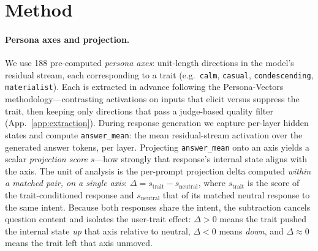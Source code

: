 \documentclass{article}
\newcommand{\ax}[1]{\texttt{#1}}   %
\begin{document}
\section{Method}
\label{sec:method}

\paragraph{Persona axes and projection.} We use 188 pre-computed \emph{persona axes}: unit-length directions in the model's residual stream, each corresponding to a trait (e.g.\ \ax{calm}, \ax{casual}, \ax{condescending}, \ax{materialist}). Each is extracted in advance following the Persona-Vectors methodology---contrasting activations on inputs that elicit versus suppress the trait, then keeping only directions that pass a judge-based quality filter (App.~\ref{app:extraction}). During response generation we capture per-layer hidden states and compute \ax{answer\_mean}: the mean residual-stream activation over the generated answer tokens, per layer. Projecting \ax{answer\_mean} onto an axis yields a scalar \emph{projection score} $s$---how strongly that response's internal state aligns with the axis. The unit of analysis is the per-prompt projection delta computed \emph{within a matched pair, on a single axis}: $\Delta = s_{\text{trait}} - s_{\text{neutral}}$, where $s_{\text{trait}}$ is the score of the trait-conditioned response and $s_{\text{neutral}}$ that of its matched neutral response to the same intent. Because both responses share the intent, the subtraction cancels question content and isolates the user-trait effect: $\Delta>0$ means the trait pushed the internal state \emph{up} that axis relative to neutral, $\Delta<0$ means \emph{down}, and $\Delta\approx0$ means the trait left that axis unmoved.
\end{document}
